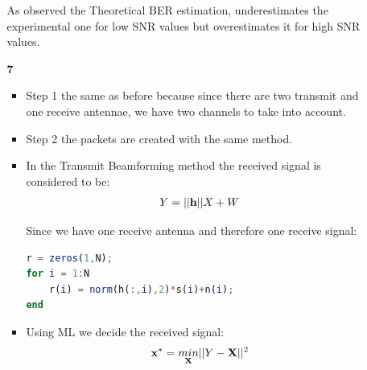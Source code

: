 \documentclass[12pt]{article}
\begin{document}
\begin{enumerate}
\begin{enumerate}
			As observed the Theoretical BER estimation, underestimates the experimental one for low SNR values but overestimates it for high SNR values.
			
			\newpage
			\item[\bf 7]
			\begin{itemize}
				\item Step 1 the same as before because since there are two transmit and one receive antennae, we have two channels to take into account.
				\item Step 2 the packets are created with the same method.
				\item In the Transmit Beamforming method the received signal is considered to be:
				\begin{align*}
					Y = ||{\bf h}||X + W
				\end{align*}
				
				Since we have one receive antenna and therefore one receive signal:
				\begin{lstlisting}[language=octave]
r = zeros(1,N);
for i = 1:N
	r(i) = norm(h(:,i),2)*s(i)+n(i);
end
				\end{lstlisting}
			
				\item Using ML we decide the received signal:
				\begin{align*}
					{\bf x}^* = \underset{{\bf X}}{min}||Y-{\bf X}||^2
				\end{align*}
				

\end{itemize}
\end{enumerate}
\end{enumerate}
\end{document}
